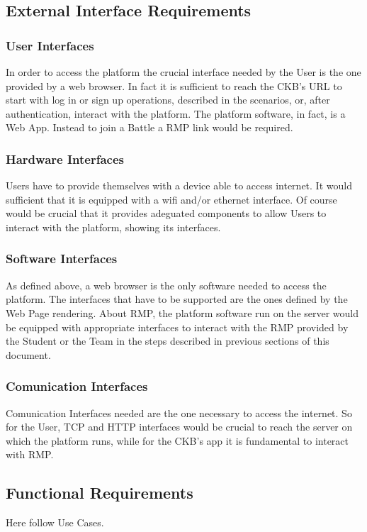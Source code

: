 
\subsection{External Interface Requirements}

\subsubsection{User Interfaces}
In order to access the platform the crucial interface needed by the User is the one provided by a web browser. In fact it is sufficient to reach the CKB's URL to start with log in or sign up operations, described in the scenarios, or, after authentication, interact with the platform. The platform software, in fact, is a Web App. Instead to join a Battle a RMP link would be required.
\subsubsection{Hardware Interfaces}
Users have to provide themselves with a device able to access internet. It would sufficient that it is equipped with a wifi and/or ethernet interface. Of course would be crucial that it provides adeguated components to allow Users to interact with the platform, showing its interfaces.
\subsubsection{Software Interfaces}
As defined above, a web browser is the only software needed to access the platform. The interfaces that have to be supported are the ones defined by the Web Page rendering. About RMP, the platform software run on the server would be equipped with appropriate interfaces to interact with the RMP provided by the Student or the Team in the steps described in previous sections of this document.
\subsubsection{Comunication Interfaces}
Comunication Interfaces needed are the one necessary to access the internet. So for the User, TCP and HTTP interfaces would be crucial to reach the server on which the platform runs, while for the CKB's app it is fundamental to interact with RMP.


\subsection{Functional Requirements}
Here follow Use Cases.

